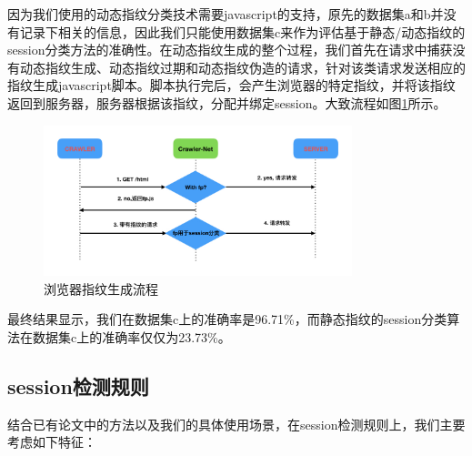 \documentclass[doctor,privacy,twoside]{buaa_mac}
\begin{document}
因为我们使用的动态指纹分类技术需要javascript的支持，原先的数据集a和b并没有记录下相关的信息，因此我们只能使用数据集c来作为评估基于静态/动态指纹的session分类方法的准确性。在动态指纹生成的整个过程，我们首先在请求中捕获没有动态指纹生成、动态指纹过期和动态指纹伪造的请求，针对该类请求发送相应的指纹生成javascript脚本。脚本执行完后，会产生浏览器的特定指纹，并将该指纹返回到服务器，服务器根据该指纹，分配并绑定session。大致流程如图\ref{fig:fp}所示。


\begin{figure}[!h]
  \centering
  \includegraphics[width=0.8\textwidth]{images/architecture/architecture002.jpeg}
  \caption{浏览器指纹生成流程}
  \label{fig:fp}
\end{figure}

最终结果显示，我们在数据集c上的准确率是96.71\%，而静态指纹的session分类算法在数据集c上的准确率仅仅为23.73\%。


\subsection{session检测规则}

结合已有论文中的方法以及我们的具体使用场景，在session检测规则上，我们主要考虑如下特征：
\end{document}
